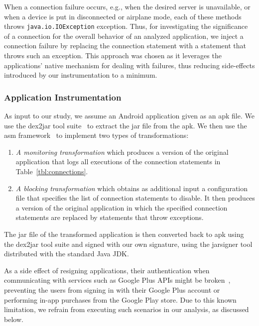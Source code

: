 When a connection failure occurs, e.g., when the desired server is unavailable, or when a device is put in disconnected or airplane mode, each of these methods throws \texttt{java.io.IOException} exception. 
Thus, for investigating the significance of a connection for the overall behavior of an analyzed application, we inject a connection failure by replacing the connection statement with a statement that throws such an exception. 
This approach was chosen as it leverages the applications' native mechanism for dealing with failures, thus reducing side-effects introduced by our instrumentation to a minimum.

\subsubsection{Application Instrumentation}
As input to our study, we assume an Android application given as an apk file. 
We use the dex2jar tool suite~\cite{dex2jar} to extract the jar file from the apk.
We then use the asm framework~\cite{asm} to implement two types of transformations: 
\begin{enumerate}[leftmargin=0.5cm]%
\item \emph{A monitoring transformation} which produces a version of the original application that logs all executions of the connection statements in Table~\ref{tbl:connections}. 
\item \emph{A blocking transformation} which obtains as additional input a configuration file that specifies the list of connection statements to disable. It then produces a version of the original application in which the specified connection statements are replaced by statements that throw exceptions.
\end{enumerate}
The jar file of the transformed application is then converted back to apk using the dex2jar tool suite and signed with our own signature, using the jarsigner tool distributed with the standard Java JDK.
 
As a side effect of resigning applications, their authentication when communicating with services such as Google Plus APIs might be broken~\cite{googleAPI}, preventing the users from signing in with their Google Plus account or performing in-app purchases from the Google Play store. Due to this known limitation, we refrain from executing such scenarios in our analysis, as discussed below. 

